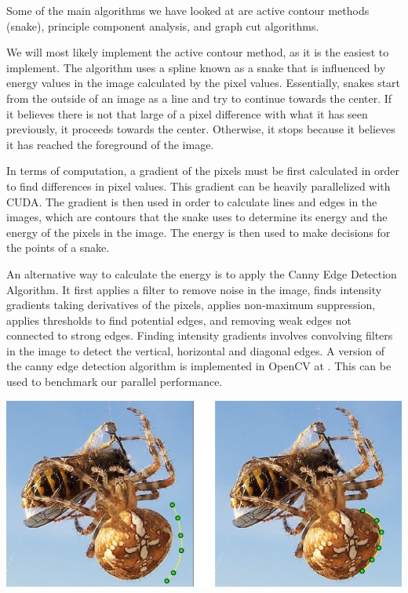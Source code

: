 \documentclass[12pt]{article}
\begin{document}
Some of the main algorithms we have looked at are active contour methods
(snake), principle component analysis, and graph cut algorithms.

We will most likely implement the active contour method, as it is the easiest
to implement. The algorithm uses a spline known as a snake that is influenced
by energy values in the image calculated by the pixel values. Essentially,
snakes start from the outside of an image as a line and try to continue towards
the center. If it believes there is not that large of a pixel difference with
what it has seen previously, it proceeds towards the center. Otherwise, it
stops because it believes it has reached the foreground of the image.

In terms of computation, a gradient of the pixels must be first calculated in
order to find differences in pixel values. This gradient can be heavily
parallelized with CUDA. The gradient is then used in order to calculate lines
and edges in the images, which are contours that the snake uses to determine
its energy and the energy of the pixels in the image. The energy is then used
to make decisions for the points of a snake.

An alternative way to calculate the energy is to apply the Canny Edge Detection
Algorithm. \cite{canny-edge} It first applies a filter to remove noise in the
image, finds intensity gradients taking derivatives of the pixels,
applies non-maximum suppression, applies thresholds to find potential edges,
and removing weak edges not connected to strong edges. Finding intensity
gradients involves convolving filters in the image to detect the vertical,
horizontal and diagonal edges. A version of the canny edge detection algorithm
is implemented in OpenCV at \cite{canny-edge}. This can be used to benchmark
our parallel performance.

\includegraphics{snake-contour-example.jpg}
\cite{contour-model}
\end{document}
